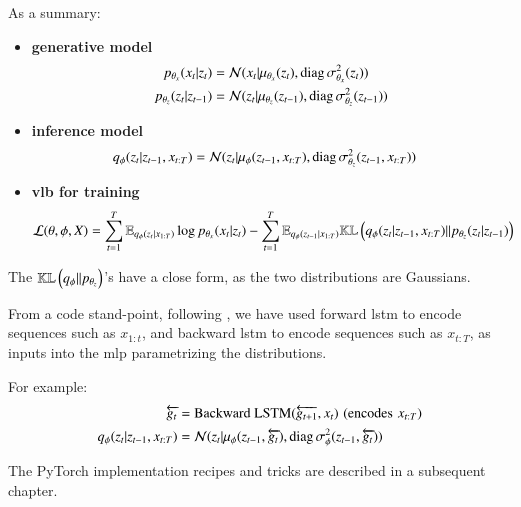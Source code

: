 As a summary:
\begin{tcolorbox}[colback=blue!5!white,colframe=black!75!black,title=Deep Kalman Filter]
\begin{itemize}
    \item \textbf{generative model}
    \begin{align}
        \label{gen_model_dkf}
        p_{\theta_x}(x_t \vert z_t) &= \mathcal{N}( x_t \vert \mu_{\theta_x}(z_t), \text{diag}\, \sigma_{\theta_x}^2(z_t))\\
        p_{\theta_z}(z_t \vert z_{t-1}) &= \mathcal{N}( z_t \vert \mu_{\theta_z}(z_{t-1}), \text{diag}\, \sigma_{\theta_z}^2(z_{t-1}))
    \end{align}
    \item \textbf{inference model}
    \begin{align}
        \label{inf_model_dkf}
        q_{\phi}(z_t \vert z_{t-1}, x_{t:T}) &= \mathcal{N}( z_t \vert \mu_{\phi}(z_{t-1}, x_{t:T}), \text{diag}\, \sigma_{\theta_z}^2(z_{t-1},x_{t:T}))
    \end{align}
    \item \textbf{\gls{vlb} for training}
    \begin{align}
        \label{vlb_dkf}
        \mathcal{L}(\theta, \phi, X) &= \sum_{t=1}^T \mathbb{E}_{q_\phi(z_{t} \vert x_{1:T})} \log{p_{\theta_x}(x_t \vert z_t)} - \sum_{t=1}^T \mathbb{E}_{q_\phi(z_{t-1} \vert x_{1:T})} \mathbb{KL}\left( q_{\phi}(z_t \vert z_{t-1}, x_{t:T}) \vert\vert p_{\theta_z}(z_t \vert z_{t-1}) \right)
    \end{align}
\end{itemize}
\end{tcolorbox}

The $\mathbb{KL}\left( q_\phi \vert\vert p_{\theta_z} \right)$'s have a close form, as the two distributions are Gaussians.

From a code stand-point, following \cite{girin_dynamical_2022}, we have used forward \gls{lstm} to encode sequences such as $x_{1:t}$, and backward \gls{lstm} to encode sequences such as $x_{t:T}$, as inputs into the \gls{mlp} parametrizing the distributions. 

For example:
\begin{align*}
    \overleftarrow{g_t} &= \text{Backward LSTM}(\overleftarrow{g_{t+1}}, x_t) \,\, (\text{encodes} \,\, x_{t:T}) \\
    q_{\phi}(z_t \vert z_{t-1}, x_{t:T}) &= \mathcal{N}( z_t \vert \mu_{\phi}(z_{t-1}, \overleftarrow{g_t}), \text{diag}\, \sigma_{\phi}^2(z_{t-1}, \overleftarrow{g_t}))
\end{align*}



The PyTorch implementation recipes and tricks are described in a subsequent chapter.
